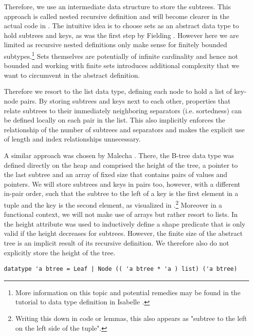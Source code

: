 Therefore, we use an intermediate data structure to store the subtrees.
This approach is called nested recursive definition
and will become clearer in the actual code in .
The intuitive idea is to choose sets as an abstract
data type to hold subtrees and keys, as was the first step by Fielding \parencite{Fielding80}.
However here we are limited as recursive nested definitions
only make sense for finitely bounded subtypes.\footnote{
    More information on this topic and potential remedies
    may be found in the tutorial to data type definition in Isabelle
    \parencite{isabelleDatatypeManual}.
}
Sets themselves are potentially of infinite cardinality
and hence not bounded and working with finite sets
introduces additional complexity that we want
to circumvent in the abstract definition.

Therefore we resort to the list data type,
defining each node to hold a list of key-node pairs.
By storing subtrees and keys next to each other,
properties that relate subtrees to their immediately
neighboring separators (i.e. sortedness)
can be defined locally on each pair in the list.
This also implicitly enforces the relationship of the number of subtrees
and separators and makes the explicit use of length and index relationships unnecessary.

A similar approach was chosen by Malecha \parencite{DBLP:conf/popl/MalechaMSW10}.
There, the B-tree data type was defined directly on the heap
and comprised the height of the tree, a pointer to the last subtree and
an array of fixed size that contains pairs of values and pointers.
We will store subtrees and keys in pairs too,
however, with a different in-pair order,
such that the subtree to the left of a key is the first element
in a tuple and the key is the second element,
as visualized in .\footnote{
    Writing this down in code or lemmas,
    this also appears as "subtree to the left on the left side of the tuple".
}
Moreover in a functional context, we will not make use of arrays
but rather resort to lists.
In \parencite{DBLP:conf/popl/MalechaMSW10} the height attribute was
used to inductively define a shape predicate that is only valid
if the height decreases for subtrees.
However, the finite size of the abstract tree is an implicit
result of its recursive definition.
We therefore also do not explicitly store the height of the tree.

\begin{lstlisting}[mathescape=true, language=Isabelle,label=lst:btree-def]
datatype 'a btree = Leaf | Node (( 'a btree * 'a ) list) ('a btree)
\end{lstlisting}

